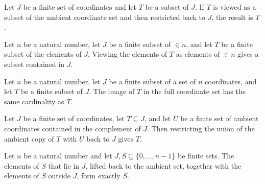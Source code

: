 \begin{theorem}
\label{FABL.restrictSubsetTo_liftSubsetFrom}
\leanok
{}
Let $J$ be a finite set of coordinates and let $T$ be a subset of $J$. If $T$ is viewed
as a subset of the ambient coordinate set and then restricted back to $J$, the result is
$T$.
\end{theorem}

\begin{theorem}
\label{FABL.liftSubsetFrom_subset}
\leanok
{}
Let $n$ be a natural number, let $J$ be a finite subset of $\in n$, and let $T$ be a
finite subset of the elements of $J$. Viewing the elements of $T$ as elements of $\in n$
gives a subset contained in $J$.
\end{theorem}

\begin{theorem}
\label{FABL.card_liftSubsetFrom}
\leanok
{}
Let $n$ be a natural number, let $J$ be a finite subset of a set of $n$ coordinates, and
let $T$ be a finite subset of $J$. The image of $T$ in the full coordinate set has the
same cardinality as $T$.
\end{theorem}

\begin{theorem}
\label{FABL.restrictSubsetTo_union_compl}
\leanok
{}
Let $J$ be a finite set of coordinates, let $T\subseteq J$, and let $U$ be a finite set
of ambient coordinates contained in the complement of $J$. Then restricting the union of
the ambient copy of $T$ with $U$ back to $J$ gives $T$.
\end{theorem}

\begin{theorem}
\label{FABL.lift_restrict_union_sdiff}
\leanok
{}
Let $n$ be a natural number and let $J,S\subseteq\{0,\ldots,n-1\}$ be finite sets. The
elements of $S$ that lie in $J$, lifted back to the ambient set, together with the
elements of $S$ outside $J$, form exactly $S$.
\end{theorem}

